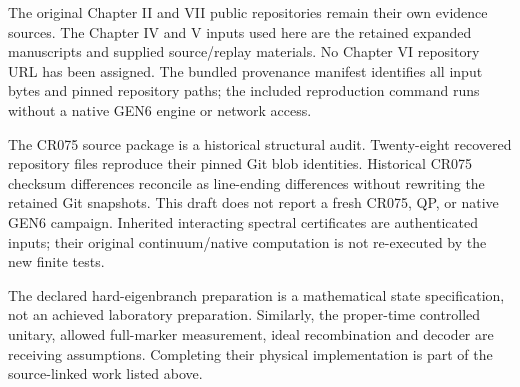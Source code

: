 The original Chapter II and VII public repositories remain their own evidence sources.\cite{chapter1,chapter2} The Chapter IV and V inputs used here are the retained expanded manuscripts and supplied source/replay materials. No Chapter VI repository URL has been assigned. The bundled provenance manifest identifies all input bytes and pinned repository paths; the included reproduction command runs without a native GEN6 engine or network access.

The CR075 source package is a historical structural audit. Twenty-eight recovered repository files reproduce their pinned Git blob identities. Historical CR075 checksum differences reconcile as line-ending differences without rewriting the retained Git snapshots. This draft does not report a fresh CR075, QP, or native GEN6 campaign. Inherited interacting spectral certificates are authenticated inputs; their original continuum/native computation is not re-executed by the new finite tests.

The declared hard-eigenbranch preparation is a mathematical state specification, not an achieved laboratory preparation. Similarly, the proper-time controlled unitary, allowed full-marker measurement, ideal recombination and decoder are receiving assumptions. Completing their physical implementation is part of the source-linked work listed above.

